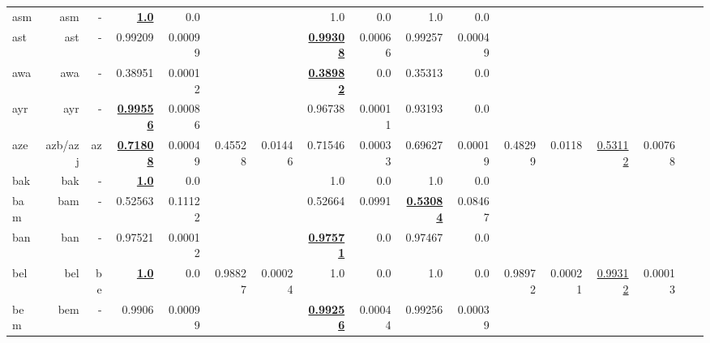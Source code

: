 \documentclass[11pt]{article}
\begin{document}
\begin{table*}[h]
{\begin{tabular}{lrrrrrrrrrrrrrrrr}
asm         & asm         & -         & \textbf{\underline{1.0}}         & 0.0         &          &          & 1.0         & 0.0         & 1.0         & 0.0         &          &          &          &          \\
ast         & ast         & -         & 0.99209         & 0.00099         &          &          & \textbf{\underline{0.99308}}         & 0.00066         & 0.99257         & 0.00049         &          &          &          &          \\
awa         & awa         & -         & 0.38951         & 0.00012         &          &          & \textbf{\underline{0.38982}}         & 0.0         & 0.35313         & 0.0         &          &          &          &          \\
ayr         & ayr         & -         & \textbf{\underline{0.99556}}         & 0.00086         &          &          & 0.96738         & 0.00011         & 0.93193         & 0.0         &          &          &          &          \\
aze         & azb/azj         & az         & \textbf{\underline{0.71808}}         & 0.00049         & 0.45528         & 0.01446         & 0.71546         & 0.00033         & 0.69627         & 0.00019         & 0.48299         & 0.0118         & \underline{0.53112}         & 0.00768         \\
bak         & bak         & -         & \textbf{\underline{1.0}}         & 0.0         &          &          & 1.0         & 0.0         & 1.0         & 0.0         &          &          &          &          \\
bam         & bam         & -         & 0.52563         & 0.11122         &          &          & 0.52664         & 0.0991         & \textbf{\underline{0.53084}}         & 0.08467         &          &          &          &          \\
ban         & ban         & -         & 0.97521         & 0.00012         &          &          & \textbf{\underline{0.97571}}         & 0.0         & 0.97467         & 0.0         &          &          &          &          \\
bel         & bel         & be         & \textbf{\underline{1.0}}         & 0.0         & 0.98827         & 0.00024         & 1.0         & 0.0         & 1.0         & 0.0         & 0.98972         & 0.00021         & \underline{0.99312}         & 0.00013         \\
bem         & bem         & -         & 0.9906         & 0.00099         &          &          & \textbf{\underline{0.99256}}         & 0.00044         & 0.99256         & 0.00039         &          &          &          &          \\

\end{tabular}}
\end{table*}
\end{document}
